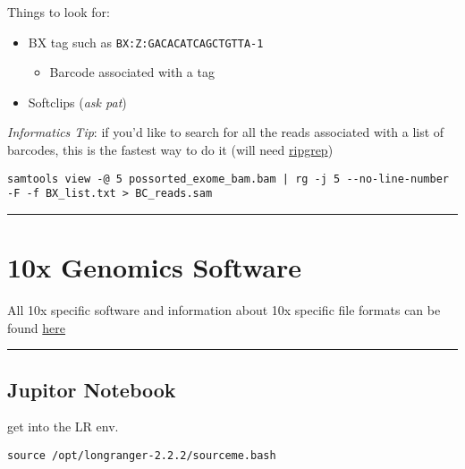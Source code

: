 \documentclass[]{article}
\providecommand{\tightlist}{%
  \setlength{\itemsep}{0pt}\setlength{\parskip}{0pt}}
\begin{document}
Things to look for:

\begin{itemize}
\tightlist
\item
  BX tag such as \texttt{BX:Z:GACACATCAGCTGTTA-1}

  \begin{itemize}
  \tightlist
  \item
    Barcode associated with a tag
  \end{itemize}
\item
  Softclips (\emph{ask pat})
\end{itemize}

\emph{Informatics Tip}: if you'd like to search for all the reads
associated with a list of barcodes, this is the fastest way to do it
(will need \href{https://github.com/BurntSushi/ripgrep}{ripgrep})

\begin{verbatim}
samtools view -@ 5 possorted_exome_bam.bam | rg -j 5 --no-line-number -F -f BX_list.txt > BC_reads.sam
\end{verbatim}

\begin{center}\rule{0.5\linewidth}{\linethickness}\end{center}

\section{10x Genomics Software}\label{x-genomics-software}

All 10x specific software and information about 10x specific file
formats can be found
\href{https://support.10xgenomics.com/genome-exome/software/pipelines/latest/what-is-long-ranger}{here}

\begin{center}\rule{0.5\linewidth}{\linethickness}\end{center}

\subsection{Jupitor Notebook}\label{jupitor-notebook}

get into the LR env.

\begin{verbatim}
source /opt/longranger-2.2.2/sourceme.bash
\end{verbatim}
\end{document}
